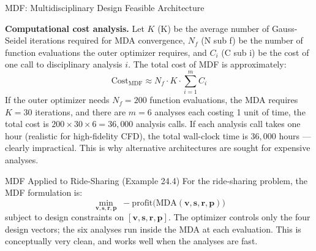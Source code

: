 \documentclass[aspectratio=169,10pt]{beamer}
\begin{document}
\begin{frame}[allowframebreaks]{MDF: Multidisciplinary Design Feasible Architecture}
  \framebreak

  \textbf{Computational cost analysis.}  Let $K$ (K) be the average
  number of Gauss-Seidel iterations required for MDA convergence,
  $N_f$ (N sub f) be the number of function evaluations the outer
  optimizer requires, and $C_i$ (C sub i) be the cost of one call to
  disciplinary analysis $i$.  The total cost of MDF is approximately:
  \[
    \text{Cost}_{\mathrm{MDF}} \approx N_f \cdot K \cdot \sum_{i=1}^{m} C_i
  \]
  If the outer optimizer needs $N_f = 200$ function evaluations, the
  MDA requires $K = 30$ iterations, and there are $m = 6$ analyses each
  costing 1 unit of time, the total cost is $200 \times 30 \times 6 = 36{,}000$
  analysis calls.  If each analysis call takes one hour (realistic for
  high-fidelity CFD), the total wall-clock time is $36{,}000$ hours ---
  clearly impractical.  This is why alternative architectures are sought
  for expensive analyses.

  \begin{block}{MDF Applied to Ride-Sharing (Example 24.4)}
    For the ride-sharing problem, the MDF formulation is:
    \[
      \min_{\mathbf{v}, \mathbf{s}, \mathbf{r}, \mathbf{p}}\;
      -\mathrm{profit}\!\bigl(\mathrm{MDA}(\mathbf{v},\mathbf{s},\mathbf{r},\mathbf{p})\bigr)
    \]
    subject to design constraints on $[\mathbf{v}, \mathbf{s}, \mathbf{r},
    \mathbf{p}]$.  The optimizer controls only the four design vectors;
    the six analyses run inside the MDA at each evaluation.  This is
    conceptually very clean, and works well when the analyses are fast.
  \end{block}

\end{frame}
\end{document}
